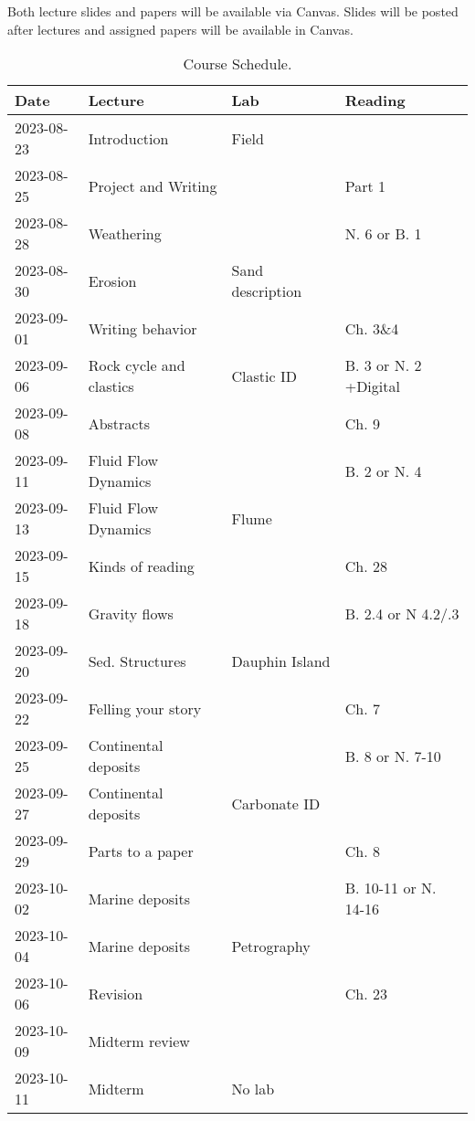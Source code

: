\documentclass[11pt,]{article}
\begin{document}
Both lecture slides and papers will be available via Canvas. Slides will
be posted after lectures and assigned papers will be available in
Canvas.

\newpage

\begin{table}

\caption{\label{tab:Schedule}Course Schedule.}
\centering
\begin{tabular}[t]{l|>{\raggedright\arraybackslash}p{5cm}|>{\raggedright\arraybackslash}p{5cm}|>{\raggedright\arraybackslash}p{5cm}}
\hline
Date & Lecture & Lab & Reading\\
\hline
2023-08-23 & Introduction & Field & \\
\hline
2023-08-25 & Project and Writing &  & Part 1\\
\hline
2023-08-28 & Weathering &  & N. 6 or B. 1\\
\hline
2023-08-30 & Erosion & Sand description & \\
\hline
2023-09-01 & Writing behavior &  & Ch. 3\&4\\
\hline
2023-09-06 & Rock cycle and clastics & Clastic ID & B. 3 or N. 2 +Digital\\
\hline
2023-09-08 & Abstracts &  & Ch. 9\\
\hline
2023-09-11 & Fluid Flow Dynamics &  & B. 2 or N. 4\\
\hline
2023-09-13 & Fluid Flow Dynamics & Flume & \\
\hline
2023-09-15 & Kinds of reading &  & Ch. 28\\
\hline
2023-09-18 & Gravity flows &  & B. 2.4 or N 4.2/.3\\
\hline
2023-09-20 & Sed. Structures & Dauphin Island & \\
\hline
2023-09-22 & Felling your story &  & Ch. 7\\
\hline
2023-09-25 & Continental deposits &  & B. 8 or N. 7-10\\
\hline
2023-09-27 & Continental deposits & Carbonate ID & \\
\hline
2023-09-29 & Parts to a paper &  & Ch. 8\\
\hline
2023-10-02 & Marine deposits &  & B. 10-11 or N. 14-16\\
\hline
2023-10-04 & Marine deposits & Petrography & \\
\hline
2023-10-06 & Revision &  & Ch. 23\\
\hline
2023-10-09 & Midterm review &  & \\
\hline
2023-10-11 & Midterm & No lab & \\

\end{tabular}
\end{table}
\end{document}
